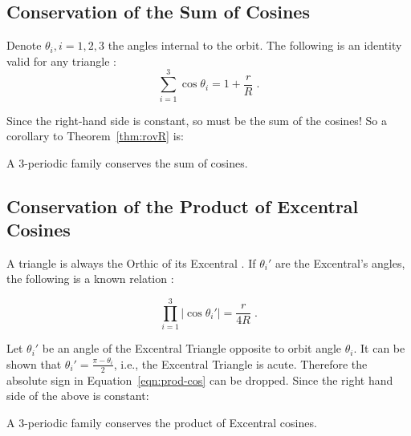 \subsection{Conservation of the Sum of Cosines}

Denote $\theta_i,i=1,2,3$ the angles internal to the orbit. The following is an identity valid for any triangle \cite{johnson29}:
%
\begin{equation}
\sum_{i=1}^{3}{\cos\theta_i}=1+\frac{r}{R}\;.
\label{eqn:rR_cos}
\end{equation}

Since the right-hand side is constant, so must be the sum of the cosines! So a corollary to Theorem~\ref{thm:rovR} is:

\begin{corollary}
\label{cor8}
A 3-periodic family conserves the sum of cosines. 
\end{corollary}

\subsection{Conservation of the Product of Excentral Cosines}

A triangle is always the Orthic
of its Excentral \cite{mw}. If $\theta_i'$ are the Excentral's angles, the following is a known relation \cite{johnson29}:

\begin{equation}
\prod_{i=1}^{3}{|\cos\theta_i'|}=\frac{r}{4R}\;.
\label{eqn:prod-cos}
\end{equation}

Let $\theta_i'$ be an angle of the Excentral Triangle opposite to orbit angle $\theta_i$. It can be shown that $\theta_i'=\frac{\pi-\theta_i}{2}$, i.e., the Excentral Triangle is acute. Therefore the absolute sign in Equation~\ref{eqn:prod-cos} can be dropped. Since the right hand side of the above is constant:

\begin{corollary}
\label{cor9}
A 3-periodic family conserves the product of Excentral cosines. 
\end{corollary}


